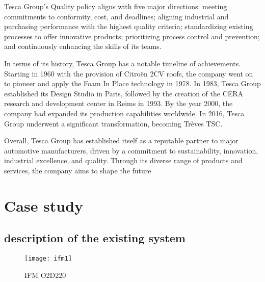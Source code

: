 Tesca Group's Quality policy aligns with five major directions: meeting commitments to conformity, cost, and deadlines; aligning industrial and purchasing performance with the highest quality criteria; standardizing existing processes to offer innovative products; prioritizing process control and prevention; and continuously enhancing the skills of its teams.\cite{T23}

In terms of its history, Tesca Group has a notable timeline of achievements. Starting in 1960 with the provision of Citroën 2CV roofs, the company went on to pioneer and apply the Foam In Place technology in 1978. In 1983, Tesca Group established its Design Studio in Paris, followed by the creation of the CERA research and development center in Reims in 1993. By the year 2000, the company had expanded its production capabilities worldwide. In 2016, Tesca Group underwent a significant transformation, becoming Trèves TSC.\cite{T23}

Overall, Tesca Group has established itself as a reputable partner to major automotive manufacturers, driven by a commitment to sustainability, innovation, industrial excellence, and quality. Through its diverse range of products and services, the company aims to shape the future\cite{T23}
\vspace{1em}
\section{Case study}

\subsection{description of the existing system }
\FloatBarrier
\begin{figure}[h]

         \centering
        \texttt{[image: ifm1]}
   
        \caption{IFM O2D220}
        \label{fig:IFM O2D220}
\FloatBarrier
    \end{figure}


